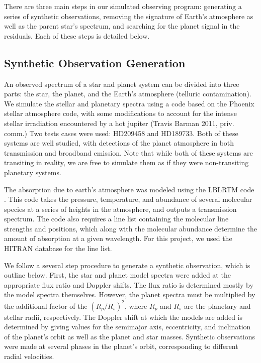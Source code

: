 \documentclass[11pt]{report}     %
\begin{document}
There are three main steps in our simulated observing program: generating
a series of synthetic observations, removing the signature of Earth's
atmosphere as well as the parent star's spectrum, and searching for
the planet signal in the residuals. Each of these steps is detailed
below.

\subsection{Synthetic Observation Generation}
An observed spectrum of a star and planet system can be divided into
three parts: the star, the planet, and the Earth's atmosphere
(telluric contamination). We simulate the stellar and planetary spectra using a code based
on the Phoenix stellar atmosphere code, with some modifications to
account for the intense stellar irradiation encountered by a hot
jupiter (Travis Barman 2011, priv. comm.) Two tests cases were used:
HD209458 and HD189733. Both of these systems are well studied,
with detections of the planet atmosphere in both transmission and 
broadband emission. Note that while both of these systems are transiting in reality, we are free to simulate them as if they were non-transiting planetary systems. 

The absorption due to earth's atmosphere was modeled using the LBLRTM
code \citep{Clough2005}. This code takes the pressure, temperature,
and abundance of several molecular species at a series of heights in
the atmosphere, and outputs a transmission spectrum. The code also
requires a line list containing the molecular
line strengths and positions, which along with the molecular abundance
determine the amount of absorption at a given wavelength. For this
project, we used the HITRAN database \citep{Rothman2009} for the line
list.

We follow a several step procedure to generate a synthetic observation, which is outline below. First, the star and
planet model spectra were added at the appropriate flux ratio and
Doppler shifts. The flux ratio is determined mostly by the model
spectra themselves. However, the planet spectra must be multiplied by the
additional factor of the $(R_p/R_s)^2$, where $R_p$ and $R_s$ are the
planetary and stellar radii, respectively. The Doppler shift at which the
models are added is determined by giving values for the semimajor
axis, eccentricity, and inclination of the planet's orbit as well as
the planet and star masses. Synthetic observations were made at
several phases in the planet's orbit, corresponding to different
radial velocities. 
\end{document}
